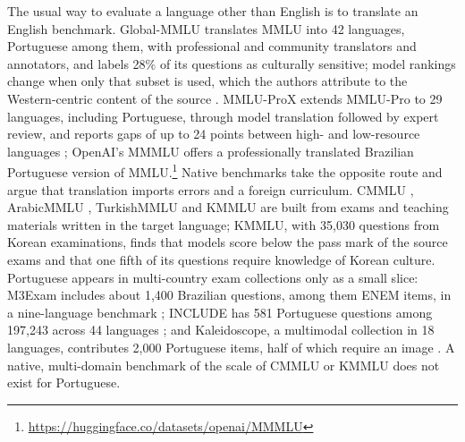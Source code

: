 The usual way to evaluate a language other than English is to translate an
English benchmark. Global-MMLU translates MMLU into 42 languages, Portuguese
among them, with professional and community translators and annotators, and
labels 28\% of its questions as culturally sensitive; model rankings change
when only that subset is used, which the authors attribute to the
Western-centric content of the source \citep{singh2025globalmmlu}. MMLU-ProX
extends MMLU-Pro to 29 languages, including Portuguese, through model
translation followed by expert review, and reports gaps of up to 24 points
between high- and low-resource languages \citep{xuan2025mmluprox}; OpenAI's
MMMLU offers a professionally translated Brazilian Portuguese version of
MMLU.\footnote{\url{https://huggingface.co/datasets/openai/MMMLU}} Native
benchmarks take the opposite route and argue that translation imports errors
and a foreign curriculum. CMMLU \citep{li2024cmmlu}, ArabicMMLU
\citep{koto2024arabicmmlu}, TurkishMMLU \citep{yuksel2024turkishmmlu} and
KMMLU \citep{son2025kmmlu} are built from exams and teaching materials written
in the target language; KMMLU, with 35,030 questions from Korean examinations,
finds that models score below the pass mark of the source exams and that one
fifth of its questions require knowledge of Korean culture. Portuguese appears
in multi-country exam collections only as a small slice: M3Exam includes about
1,400 Brazilian questions, among them ENEM items, in a nine-language benchmark
\citep{zhang2023m3exam}; INCLUDE has 581 Portuguese questions among 197,243
across 44 languages \citep{romanou2025include}; and Kaleidoscope, a
multimodal collection in 18 languages, contributes 2,000 Portuguese items,
half of which require an image \citep{salazar2026kaleidoscope}. A native,
multi-domain benchmark of the scale of CMMLU or KMMLU does not exist for
Portuguese.

